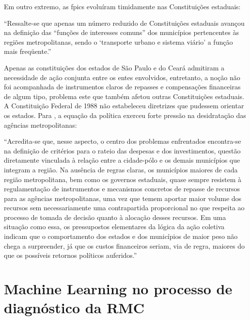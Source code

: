 	Em outro extremo, as \gls{fpic}s evoluíram timidamente nas Constituições estaduais:
	
	\begin{citacao}
		``Ressalte-se que apenas um número reduzido de Constituições estaduais avançou na definição das “funções de interesses comuns” dos municípios pertencentes às regiões metropolitanas, sendo o `transporte urbano e sistema viário' a função mais freqüente.'' \cite[p. 102]{guia2015a}
	\end{citacao}

	Apenas as constituições dos estados de São Paulo e do Ceará admitiram a necessidade de ação conjunta entre os entes envolvidos, entretanto, a noção não foi acompanhada de instrumentos claros de repasses e compensações financeiras de algum tipo, problema este que também afetou outras Constituições estaduais. A Constituição Federal de 1988 não estabeleceu diretrizes que pudessem orientar os estados. Para , a equação da política exerceu forte pressão na desidratação das agências metropolitanas:
	
	\begin{citacao}
		``Acredita-se que, nesse aspecto, o centro dos problemas enfrentados encontra-se na definição de critérios para o rateio das despesas e dos investimentos, questão diretamente vinculada à relação entre a cidade-pólo e os demais municípios que integram a região. Na ausência de regras claras, os municípios maiores de cada região metropolitana, bem como os governos estaduais, quase sempre resistem à regulamentação de instrumentos e mecanismos concretos de repasse de recursos para as agências metropolitanas, uma vez que temem aportar maior volume dos recursos sem necessariamente uma contrapartida proporcional no que respeita ao processo de tomada de decisão quanto à alocação desses recursos. Em uma situação como essa, os pressupostos elementares da lógica da ação coletiva indicam que o comportamento dos estados e dos municípios de maior peso não chega a surpreender, já que os custos financeiros seriam, via de regra, maiores do que os possíveis retornos políticos auferidos.''
	\end{citacao}

	\section{Machine Learning no processo de diagnóstico da RMC} \label{sec:machine}
	
